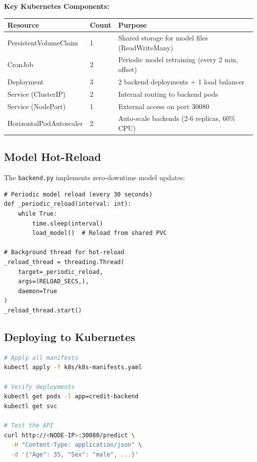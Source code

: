 \documentclass[11pt,a4paper]{article}
\begin{document}
\textbf{Key Kubernetes Components:}

\begin{table}[H]
\centering
\small
\begin{tabular}{@{}llp{6cm}@{}}
\toprule
\textbf{Resource} & \textbf{Count} & \textbf{Purpose} \\
\midrule
PersistentVolumeClaim & 1 & Shared storage for model files (ReadWriteMany) \\
CronJob & 2 & Periodic model retraining (every 2 min, offset) \\
Deployment & 3 & 2 backend deployments + 1 load balancer \\
Service (ClusterIP) & 2 & Internal routing to backend pods \\
Service (NodePort) & 1 & External access on port 30080 \\
HorizontalPodAutoscaler & 2 & Auto-scale backends (2-6 replicas, 60\% CPU) \\
\bottomrule
\end{tabular}
\end{table}

\subsection{Model Hot-Reload}

The \texttt{backend.py} implements zero-downtime model updates:

\begin{lstlisting}[style=pythonstyle]
# Periodic model reload (every 30 seconds)
def _periodic_reload(interval: int):
    while True:
        time.sleep(interval)
        load_model()  # Reload from shared PVC

# Background thread for hot-reload
_reload_thread = threading.Thread(
    target=_periodic_reload,
    args=(RELOAD_SECS,),
    daemon=True
)
_reload_thread.start()
\end{lstlisting}

\subsection{Deploying to Kubernetes}

\begin{lstlisting}[language=bash, style=yamlstyle]
# Apply all manifests
kubectl apply -f k8s/k8s-manifests.yaml

# Verify deployments
kubectl get pods -l app=credit-backend
kubectl get svc

# Test the API
curl http://<NODE-IP>:30080/predict \
  -H "Content-Type: application/json" \
  -d '{"Age": 35, "Sex": "male", ...}'
\end{lstlisting}
\end{document}

